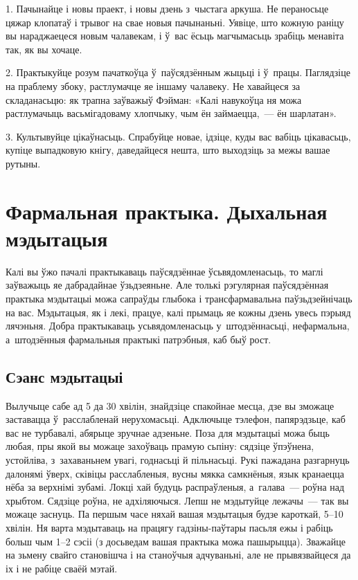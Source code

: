 1. Пачынайце і новы праект, і новы дзень з~чыстага аркуша. Не пераносьце цяжар клопатаў і трывог на свае новыя пачынаньні. Уявіце, што кожную раніцу вы нараджаецеся новым чалавекам, і ў~вас ёсьць магчымасьць зрабіць менавіта так, як вы хочаце.

2. Практыкуйце розум пачаткоўца ў~паўсядзённым жыцьці і ў~працы. Паглядзіце на праблему збоку, растлумачце яе іншаму чалавеку. Не хавайцеся за складанасьцю: як трапна заўважыў Фэйман: «Калі навукоўца ня можа растлумачыць васьмігадоваму хлопчыку, чым ён займаецца,~--- ён шарлатан».

3. Культывуйце цікаўнасьць. Спрабуйце новае, ідзіце, куды вас вабіць цікавасьць, купіце выпадковую кнігу, даведайцеся нешта, што выходзіць за межы вашае рутыны.


\section{Фармальная практыка. Дыхальная мэдытацыя}

Калі вы ўжо пачалі практыкаваць паўсядзённае ўсьвядомленасьць, то маглі заўважыць яе дабрадайнае ўзьдзеяньне. Але толькі рэгулярная паўсядзённая практыка мэдытацыі можа сапраўды глыбока і трансфармавальна паўзьдзейнічаць на вас. Мэдытацыя, як і лекі, працуе, калі прымаць яе кожны дзень увесь пэрыяд лячэньня. Добра практыкаваць усьвядомленасьць у~штодзённасьці, нефармальна, а~штодзённыя фармальныя практыкі патрэбныя, каб быў рост. 


\subsection*{Сэанс мэдытацыі}

Вылучыце сабе ад 5 да 30 хвілін, знайдзіце спакойнае месца, дзе вы зможаце заставацца ў~расслабленай нерухомасьці. Адключыце тэлефон, папярэдзьце, каб вас не турбавалі, абярыце зручнае адзеньне. Поза для мэдытацыі можа быць любая, пры якой вы можаце захоўваць прамую сьпіну: сядзіце ўпэўнена, устойліва, з~захаваньнем увагі, годнасьці й пільнасьці. Рукі пажадана разгарнуць далонямі ўверх, сківіцы расслабленыя, вусны мякка самкнёныя, язык кранаецца нёба за верхнімі зубамі. Локці хай будуць распраўленыя, а~галава~--- роўна над хрыбтом. Сядзіце роўна, не адхіляючыся. Лепш не мэдытуйце лежачы~--- так вы можаце заснуць. Па першым часе няхай вашая мэдытацыя будзе кароткай, 5--10 хвілін. Ня варта мэдытаваць на працягу гадзіны-паўтары пасьля ежы і рабіць больш чым 1--2 сэсіі (з досьведам вашая практыка можа пашырыцца). Зважайце на зьмену свайго становішча і на станоўчыя адчуваньні, але не прывязвайцеся да іх і не рабіце сваёй мэтай. 

